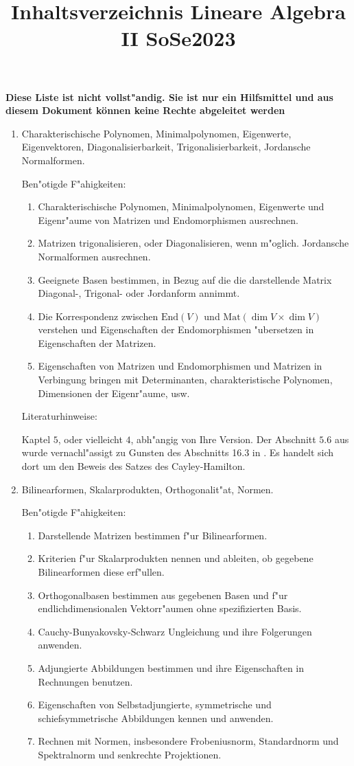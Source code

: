 \documentclass[a4paper]{article}
\title{Inhaltsverzeichnis Lineare Algebra II SoSe2023}
\begin{document}
\maketitle

\textbf{Diese Liste ist nicht vollst"andig. Sie ist nur ein Hilfsmittel und aus diesem Dokument können keine Rechte abgeleitet werden}

\begin{enumerate}
\item
Charakterischische Polynomen, Minimalpolynomen, Eigenwerte, Eigenvektoren, Diagonalisierbarkeit, Trigonalisierbarkeit, Jordansche Normalformen.

Ben"otigde F"ahigkeiten:
\begin{enumerate}
\item
Charakterischische Polynomen, Minimalpolynomen, Eigenwerte und Eigenr"aume von Matrizen und Endomorphismen ausrechnen.
\item
Matrizen trigonalisieren, oder Diagonalisieren, wenn m"oglich. Jordansche Normalformen ausrechnen.
\item
Geeignete Basen bestimmen, in Bezug auf die die darstellende Matrix Diagonal-, Trigonal- oder Jordanform annimmt.
\item
Die Korrespondenz zwischen $\text{End}(V)$ und $\text{Mat}(\dim V \times \dim V)$ verstehen und Eigenschaften der Endomorphismen "ubersetzen in Eigenschaften der Matrizen.
\item
Eigenschaften von Matrizen und Endomorphismen und Matrizen in Verbingung bringen mit Determinanten, charakteristische Polynomen, Dimensionen der Eigenr"aume, usw.
\end{enumerate}
Literaturhinweise:

\cite{FS} Kaptel $5$, oder vielleicht $4$, abh"angig von Ihre Version. Der Abschnitt $5.6$ aus \cite{FS} wurde vernachl"assigt zu Gunsten des Abschnitts 16.3 in \cite{G}. Es handelt sich dort um den Beweis des Satzes des Cayley-Hamilton.
\item
Bilinearformen, Skalarprodukten, Orthogonalit"at, Normen.

Ben"otigde F"ahigkeiten:
\begin{enumerate}
\item
Darstellende Matrizen bestimmen f"ur Bilinearformen.
\item
Kriterien f"ur Skalarprodukten nennen und ableiten, ob gegebene Bilinearformen diese erf"ullen.
\item
Orthogonalbasen bestimmen aus gegebenen Basen und f"ur endlichdimensionalen Vektorr"aumen ohne spezifizierten Basis.
\item
Cauchy-Bunyakovsky-Schwarz Ungleichung und ihre Folgerungen anwenden.
\item
Adjungierte Abbildungen bestimmen und ihre Eigenschaften in Rechnungen benutzen.
\item
Eigenschaften von Selbstadjungierte, symmetrische und schiefsymmetrische Abbildungen kennen und anwenden.
\item
Rechnen mit Normen, insbesondere Frobeniusnorm, Standardnorm und Spektralnorm und senkrechte Projektionen.
\end{enumerate}


\end{enumerate}
\end{document}
